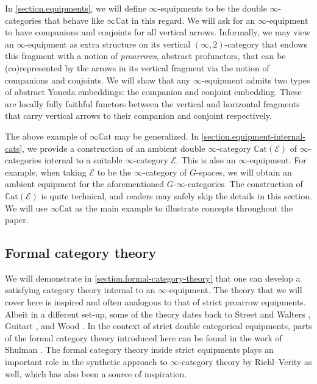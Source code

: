 \documentclass[a4paper, 11pt]{amsart}
\numberwithin{theorem}{section}
\theoremstyle{definition}
\newcommand{\E}{\mathscr{E}}
\newcommand{\CCAT}{\mathbb{C}\mathrm{at}}
\begin{document}
In \cref{section.equipments}, we will define $\infty$-equipments to be the double $\infty$-categories that behave like $\infty\CCAT$ in this regard. We will ask for an $\infty$-equipment to have companions and conjoints for all vertical arrows. 
Informally, we may view an $\infty$-equipment as extra structure on its vertical $(\infty,2)$-category that endows this fragment with a notion of \textit{proarrows}, abstract profunctors, that can be (co)represented 
by the arrows in its vertical fragment via the notion of companions and conjoints. We will show that any $\infty$-equipment admits 
two types of abstract Yoneda embeddings: the companion and conjoint embedding. These are locally fully faithful functors between the vertical and horizontal fragments 
that carry vertical arrows to their companion and conjoint respectively.

The above example of $\infty\CCAT$ may be generalized. In \cref{section.equipment-internal-cats}, we provide a construction of an ambient double $\infty$-category $\CCAT(\E)$ of $\infty$-categories internal to a suitable $\infty$-category $\E$. This 
is also an $\infty$-equipment. For example, when taking $\E$ to be the $\infty$-category of $G$-spaces, we will obtain an ambient equipment for the aforementioned $G$-$\infty$-categories.
The construction of $\CCAT(\E)$ is quite technical, and readers may safely skip the details in this section. We will use $\infty\CCAT$ as the main example to illustrate concepts throughout the paper.

\subsection{Formal category theory} We will demonstrate in \cref{section.formal-category-theory} 
that one can develop a satisfying category theory internal to an $\infty$-equipment.
The theory that we will cover here is inspired and often analogous to that of strict proarrow equipments. Albeit in a different set-up, 
some of the theory dates back to Street and Walters \cite{StreetWalters}, Guitart \cite{Guitart}, and Wood \cite{Wood}. In the context 
of strict double categorical equipments, parts of the formal category theory introduced here can be found in the work of Shulman \cite{ShulmanEnInCats}. 
The formal category theory inside strict equipments plays an important role in the synthetic approach to $\infty$-category theory by Riehl--Verity \cite{RiehlVerityFormal} \cite[Chapter 13]{RiehlVerity} as well,
which 
has also been a source of inspiration.
\end{document}
